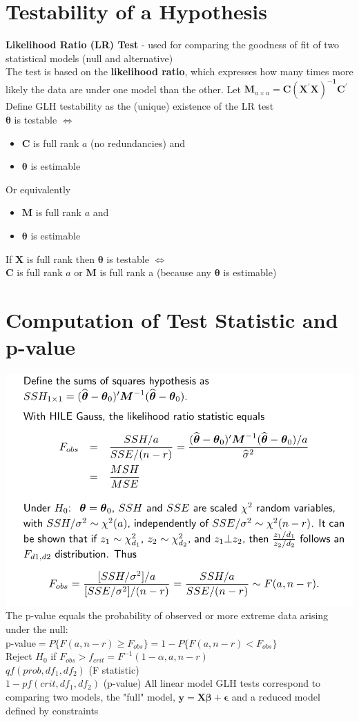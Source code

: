 \documentclass[openany]{book}
\newcommand{\B}{\beta}
\newcommand{\lra}{\Leftrightarrow}
\numberwithin{equation}{section}
\begin{document}
\begin{flushleft}
\section{Testability of a Hypothesis}
\textbf{Likelihood Ratio (LR) Test} - used for comparing the goodness of fit of two statistical models (null and alternative)\\
The test is based on the \textbf{likelihood ratio}, which expresses how many times more likely the data are under one model than the other.\medbreak
Let $\bm{M}_{a\times a}=\bm{C(X^{'}X)^{-1}C^{'}}$\\
Define GLH testability as the (unique) existence of the LR test\\
$\bm{\theta}$ is testable $\lra$
\begin{itemize}
\item $\bm{C}$ is full rank $a$ (no redundancies) and
\item $\bm{\theta}$ is estimable\\
\end{itemize}
Or equivalently
\begin{itemize}
\item $\bm{M}$ is full rank $a$ and
\item $\bm{\theta}$ is estimable
\end{itemize} 
If $\bm{X}$ is full rank then $\bm{\theta}$ is testable $\Leftrightarrow$\\
$\bm{C}$ is full rank $a$ or $\bm{M}$ is full rank a (because any $\bm{\theta}$ is estimable)\\
\section{Computation of Test Statistic and p-value}
\includegraphics[scale=.5]{lr.png}\\
The p-value equals the probability of observed or more extreme data
arising under the null:\\
p-value$=P\{F(a,n-r)\geq F_{obs} \}=1-P\{F(a,n-r)<F_{obs} \}$\\
Reject $H_0$ if $F_{obs}>f_{crit}=F^{-1}(1-\alpha,a,n-r)$\\
$qf(prob,{df}_1,{df}_2)$ (F statistic)\\
$1-pf(crit,{df}_1,{df}_2)$ (p-value)\medbreak
All linear model GLH tests correspond to comparing two models, the
"full" model, $\bm{y}=\bm{X\B}+\bm{\epsilon}$ and a reduced model defined by
constraints

\end{flushleft}
\end{document}

